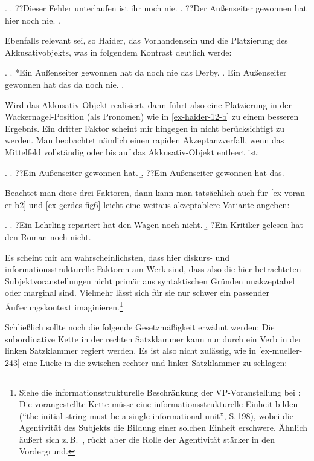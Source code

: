 \ex. 
\a. ??Dieser Fehler unterlaufen ist ihr noch nie.
\b. ??Der Au\ss enseiter gewonnen hat hier noch nie.
\z. \citep[(10)]{Haider:90}

Ebenfalls relevant sei, so Haider, das Vorhandensein und die Platzierung des Akkusativobjekts, was in folgendem Kontrast deutlich werde: 

\ex. \label{ex-haider-12} 
\a. *Ein Au\ss enseiter gewonnen hat da noch nie das Derby.\label{ex-haider-12-a}
\b. Ein Au\ss enseiter gewonnen hat das da noch nie.\label{ex-haider-12-b}
\z. \citep[(12b), (12c)]{Haider:90}

Wird das Akkusativ-Objekt realisiert, dann führt also eine Platzierung in der Wackernagel-Position (als Pronomen) wie in \ref{ex-haider-12-b} zu einem besseren Ergebnis. Ein dritter Faktor scheint mir hingegen in \cite{Haider:90} nicht berücksichtigt zu werden. Man beobachtet nämlich einen rapiden Akzeptanzverfall, wenn das Mittelfeld vollständig oder bis auf das Akkusativ-Objekt entleert ist: 

\ex. 
\a. ??Ein Au\ss enseiter gewonnen hat.
\b. ??Ein Au\ss enseiter gewonnen hat das.

Beachtet man diese drei Faktoren, dann kann man tatsächlich auch für \ref{ex-voran-er-b2} und \ref{ex-gerdes-fig6} leicht eine weitaus akzeptablere Variante angeben:

\ex.
\a. ?Ein Lehrling repariert hat den Wagen noch nicht.  
\b. ?Ein Kritiker gelesen hat den Roman noch nicht.

Es scheint mir am wahrscheinlichsten, dass hier diskurs- und informationsstrukturelle Faktoren am Werk sind, dass also die hier betrachteten Subjektvoranstellungen nicht primär aus syntaktischen Gründen unakzeptabel oder marginal sind. Vielmehr lässt sich für sie nur schwer ein passender Äu\ss erungskontext imaginieren.\footnote{Siehe die informationsstrukturelle Beschränkung der VP-Voranstellung bei \citet[Chapter~4, Section~5.2.1]{Cook:01}: Die vorangestellte Kette müsse eine informationsstrukturelle Einheit bilden ("`the initial string must be a single informational unit"', S.\,198), wobei die Agentivität des Subjekts die Bildung einer solchen Einheit erschwere. Ähnlich äußert sich z.\,B.\ \citet[\S~5]{Gerdes:04}, rückt aber die Rolle der Agentivität stärker in den Vordergrund.} 

Schlie\ss lich sollte noch die folgende Gesetzmä\ss igkeit erwähnt werden: Die subordinative Kette in der rechten Satzklammer kann nur durch ein Verb in der linken Satzklammer regiert werden. Es ist also nicht zulässig, wie in \ref{ex-mueller-243} eine Lücke in die  zwischen rechter und linker Satzklammer zu schlagen: 

